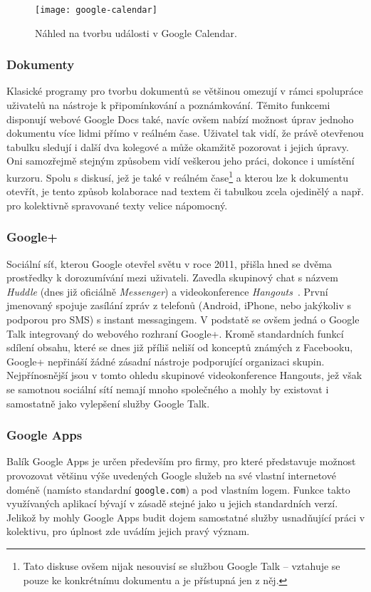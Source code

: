 \documentclass[12pt,oneside,final]{fithesis2}
\begin{document}
\begin{figure}[H]
    \texttt{[image: google-calendar]}
    \caption{Náhled na tvorbu události v Google Calendar.}
\end{figure}

\subsubsection*{Dokumenty}
Klasické programy pro tvorbu dokumentů se většinou omezují v rámci spolupráce uživatelů na nástroje k připomínkování a poznámkování. Těmito funkcemi disponují webové Google Docs také, navíc ovšem nabízí možnost úprav jednoho dokumentu více lidmi přímo v reálném čase. Uživatel tak vidí, že právě otevřenou tabulku sledují i další dva kolegové a může okamžitě pozorovat i jejich úpravy. Oni samozřejmě stejným způsobem vidí veškerou jeho práci, dokonce i umístění kurzoru. Spolu s diskusí, jež je také v reálném čase\footnote{Tato diskuse ovšem nijak nesouvisí se službou Google Talk -- vztahuje se pouze ke konkrétnímu dokumentu a je přístupná jen z něj.} a kterou lze k dokumentu otevřít, je tento způsob kolaborace nad textem či tabulkou zcela ojedinělý a např. pro kolektivně spravované texty velice nápomocný.

\subsubsection*{Google+}
Sociální síť, kterou Google otevřel světu v roce 2011, přišla hned se dvěma  prostředky k dorozumívání mezi uživateli. Zavedla skupinový chat s názvem \emph{Huddle} (dnes již oficiálně \emph{Messenger}) a videokonference \emph{Hangouts}~\cite{gundotra2010introducing}. První jmenovaný spojuje zasílání zpráv z telefonů (Android, iPhone, nebo jakýkoliv s podporou pro SMS) s instant messagingem. V podstatě se ovšem jedná o Google Talk integrovaný do webového rozhraní Google+. Kromě standardních funkcí sdílení obsahu, které se dnes již příliš neliší od konceptů známých z Facebooku, Google+ nepřináší žádné zásadní nástroje podporující organizaci skupin. Nejpřínosnější jsou v tomto ohledu skupinové videokonference Hangouts, jež však se samotnou sociální sítí nemají mnoho společného a mohly by existovat i samostatně jako vylepšení služby Google Talk.

\subsubsection*{Google Apps}\label{googleApps}
Balík Google Apps je určen především pro firmy, pro které představuje možnost provozovat většinu výše uvedených Google služeb na své vlastní internetové doméně (namísto standardní {\tt google.com}) a pod vlastním logem. Funkce takto využívaných aplikací bývají v zásadě stejné jako u jejich standardních verzí. Jelikož by mohly Google Apps budit dojem samostatné služby usnadňující práci v kolektivu, pro úplnost zde uvádím jejich pravý význam.
\end{document}
